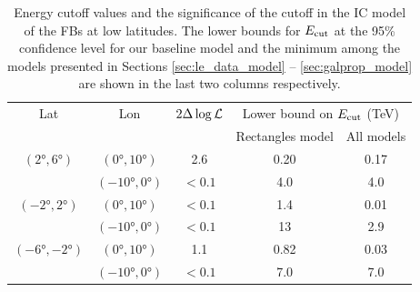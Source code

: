 \begin{table}
  \begin{center}
    \caption{Energy cutoff values and the significance of the cutoff in the IC model of the FBs at low latitudes.
The lower bounds for $E_{\text{cut}}$ at the 95\% confidence level for our baseline model and the minimum among the models 
presented in Sections \ref{sec:le_data_model} -- \ref{sec:galprop_model}
are shown in the last two columns respectively.
}
    \label{tab:IC}
    \begin{tabular}{|c|c|c|c|c|} %
     	\hline
		 Lat & Lon  & $2 \Delta \log {\mathcal{L}}$ & \multicolumn{2}{c|}{Lower bound on $E_{\text{cut}}$ (TeV) } \\ 
		       &        &                                  &  \multicolumn{1}{c}{Rectangles model} & All models \\ 
		\hline
  		$(\ang{2}, \ang{6})$ & $(\ang{0}, \ang{10})$ & 2.6  & {0.20} & {0.17}\\ 
		& $(\ang{-10}, \ang{0})$ & $ < 0.1$  & 4.0  & 4.0 \\ 
 		\hline
  		$(\ang{-2}, \ang{2})$ & $(\ang{0}, \ang{10})$ & $ < 0.1$ & {1.4} & 0.01 \\ 
		& $(\ang{-10}, \ang{0})$ & $ < 0.1$ & 13  & 2.9  \\ 
 		\hline
  		$(\ang{-6}, \ang{-2})$ & $(\ang{0}, \ang{10})$ & 1.1 & {0.82} & 0.03 \\ 
		& $(\ang{-10}, \ang{0})$& $ < 0.1$ & {7.0} & {7.0} \\ 
 \hline
    \end{tabular}
  \end{center}
\end{table}






